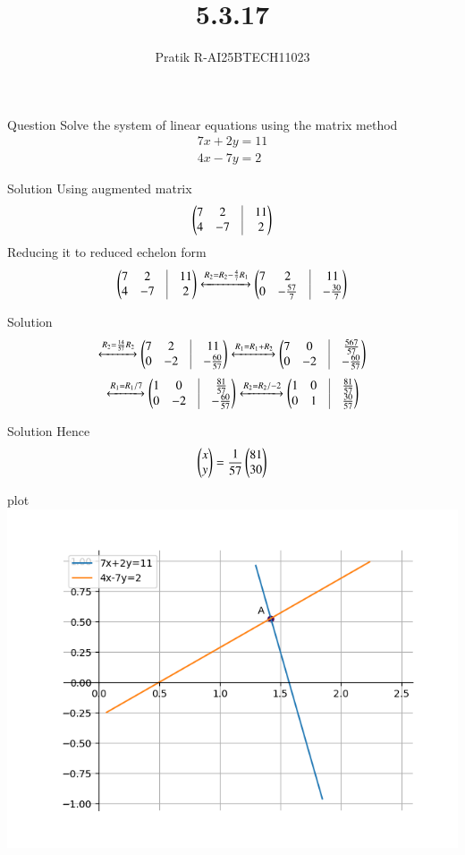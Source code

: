 \documentclass{beamer}
\title 
{5.3.17}
\author 
{Pratik R-AI25BTECH11023}
\begin{document}
\frame{\titlepage}
\begin{frame}{Question}
Solve the system of linear equations using the matrix method 
\begin{align}
    7x+2y=11 \\
    4x-7y=2
\end{align}
\end{frame}
\begin{frame}{Solution}
Using augmented matrix
\begin{align}
   \myvec{7 & 2 &\vrule &11 \\
   4 & -7 &\vrule &2}
\end{align}
Reducing it to reduced echelon form
\begin{align}
    \myvec{7 & 2 &\vrule &11 \\
   4 & -7 &\vrule &2} \xleftrightarrow{R_2 = R_2- \frac{4}{7} R_1 } \myvec{7 & 2 &\vrule &11 \\
   0 & -\frac{57}{7} &\vrule &-\frac{30}{7}}
\end{align}
\end{frame}
\begin{frame}{Solution}
\begin{align}
\xleftrightarrow{R_2= \frac{14}{57} R_2 } \myvec{7 & 2 &\vrule &11 \\
   0 & -2 &\vrule &-\frac{60}{57}}
    \xleftrightarrow{R_1 = R_1+ R_2} \myvec{7 & 0 &\vrule &\frac{567}{57} \\
   0 & -2 &\vrule &-\frac{60}{57}} 
\end{align}
\begin{align}
    \xleftrightarrow{R_1 = R_1/7} \myvec{1 & 0 &\vrule &\frac{81}{57} \\
   0 & -2 &\vrule &-\frac{60}{57}} \xleftrightarrow{R_2 = R_2/-2} \myvec{1 & 0 &\vrule &\frac{81}{57} \\
   0 & 1 &\vrule &\frac{30}{57}} 
\end{align}
\end{frame}
\begin{frame}{Solution}
Hence 
\begin{align}
    \begin{pmatrix}x \\y\end{pmatrix} = \frac{1}{57} \begin{pmatrix}81\\30\end{pmatrix}
\end{align}
\end{frame}
\begin{frame}{plot}
\centering
    \includegraphics[width=\columnwidth, height=0.8\textheight, keepaspectratio]{../figs/fig.png}     
\end{frame}
\end{document}
